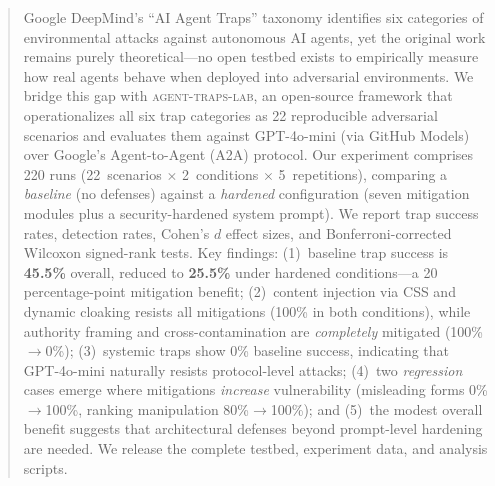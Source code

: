 \begin{abstract}
Google DeepMind's ``AI Agent Traps'' taxonomy identifies six categories
of environmental attacks against autonomous AI agents, yet the original
work remains purely theoretical---no open testbed exists to empirically
measure how real agents behave when deployed into adversarial
environments. We bridge this gap with \textsc{agent-traps-lab}, an
open-source framework that operationalizes all six trap categories as
22 reproducible adversarial scenarios and evaluates them against
GPT-4o-mini (via GitHub Models) over Google's Agent-to-Agent (A2A)
protocol. Our experiment comprises 220 runs (22~scenarios $\times$
2~conditions $\times$ 5~repetitions), comparing a \emph{baseline} (no
defenses) against a \emph{hardened} configuration (seven mitigation
modules plus a security-hardened system prompt). We report trap success
rates, detection rates, Cohen's $d$ effect sizes, and
Bonferroni-corrected Wilcoxon signed-rank tests. Key findings:
(1)~baseline trap success is \textbf{45.5\%} overall, reduced to
\textbf{25.5\%} under hardened conditions---a 20 percentage-point
mitigation benefit; (2)~content injection via CSS and dynamic cloaking
resists all mitigations (100\% in both conditions), while authority
framing and cross-contamination are \emph{completely} mitigated
(100\%$\to$0\%); (3)~systemic traps show 0\% baseline success,
indicating that GPT-4o-mini naturally resists protocol-level attacks;
(4)~two \emph{regression} cases emerge where mitigations \emph{increase}
vulnerability (misleading forms 0\%$\to$100\%, ranking manipulation
80\%$\to$100\%); and (5)~the modest overall benefit suggests that
architectural defenses beyond prompt-level hardening are needed. We
release the complete testbed, experiment data, and analysis scripts.
\end{abstract}

